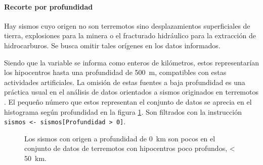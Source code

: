 \documentclass[a4paper]{report}
\begin{document}
\paragraph{Recorte por profundidad}

Hay sismos cuyo origen no son terremotos sino desplazamientos superficiales de tierra, explosiones para la minera o el fracturado hidráulico para la extracción de hidrocarburos.
Se busca omitir tales orígenes en los datos informados.

Siendo que la variable se informa como enteros de kilómetros, estos representarían los hipocentros hasta una profundidad de \SI{500}{\metre}, compatibles con estas actividades artificiales.
La omisión de estas fuentes a baja profundidad es una práctica usual en el análisis de datos orientados a sismos originados en terremotos \cite{hu_applying_2024}.
El pequeño número que estos representan  el conjunto de datos se aprecia en el histograma según profundidad en la figura \ref{fig:histograma_profundidad}.
Son filtrados con la instrucción \verb'sismos <- sismos[Profundidad > 0]'.
\begin{figure}[!ht]
	\centering
	
  \vspace{-1cm} %
	\caption{Los sismos con origen a profundidad de \SI{0}{\kilo\metre} son pocos en el conjunto de datos de terremotos con hipocentros poco profundos, < \SI{50}{\kilo\metre}.}
	\label{fig:histograma_profundidad}
\end{figure}
\end{document}
